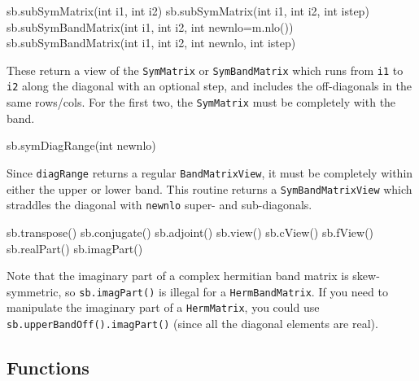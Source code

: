 \documentclass[twoside,letterpaper,11pt]{article}
\renewcommand{\tt}[1]{{\lstinline {#1}}}
\begin{document}
\begin{tmvcode}
sb.subSymMatrix(int i1, int i2)
sb.subSymMatrix(int i1, int i2, int istep)
sb.subSymBandMatrix(int i1, int i2, int newnlo=m.nlo())
sb.subSymBandMatrix(int i1, int i2, int newnlo, int istep)
\end{tmvcode}
These return a view of the \tt{SymMatrix} or \tt{SymBandMatrix} which runs
from \tt{i1} to \tt{i2} along the diagonal with an optional step,
and includes the off-diagonals in the same rows/cols.  For the first two,
the \tt{SymMatrix} must be completely with the band.

\begin{tmvcode}
sb.symDiagRange(int newnlo)
\end{tmvcode}
Since \tt{diagRange} returns a regular \tt{BandMatrixView}, it must be completely
within either the upper or lower band.  This routine returns a \tt{SymBandMatrixView}
which straddles the diagonal with \tt{newnlo} super- and sub-diagonals.

\begin{tmvcode}
sb.transpose()
sb.conjugate()
sb.adjoint()
sb.view()
sb.cView()
sb.fView()
sb.realPart()
sb.imagPart()
\end{tmvcode}
Note that the imaginary part of a complex hermitian band matrix is
skew-symmetric, so \tt{sb.imagPart()} is illegal for a \tt{HermBandMatrix}.
If you need to manipulate the imaginary part of a \tt{HermMatrix}, 
you could use
\tt{sb.upperBandOff().imagPart()} 
(since all the diagonal elements are real).
\vspace{12pt}

\subsection{Functions}
\label{SymBandMatrix_Functions}
\end{document}

